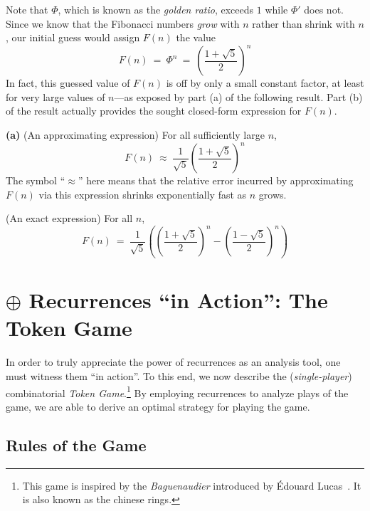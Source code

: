 \noindent
Note that $\Phi$, which is known as the \textit{golden ratio}, exceeds $1$ while $\Phi'$ does not.  Since we know that the Fibonacci numbers {\em grow} with $n$ rather than shrink with $n$, our initial guess would assign $F(n)$ the value
\[ F(n) \ = \ \Phi^n \ = \ {\displaystyle \left( \frac{1+\sqrt{5}}{2} \right)^n } \]
In fact, this guessed value of $F(n)$ is off by only a small constant factor, at least for very large values of $n$---as exposed by part (a) of the following result.  Part (b) of the result actually provides the sought closed-form expression for $F(n)$.

\begin{prop}
\label{thm:FibNo-GoldenRatio}
{\bf (a)} {\rm (An approximating expression)}
For all sufficiently large $n$,
\[ F(n) \ \approx \ \frac{1}{\sqrt{5}} \left(\frac{1+\sqrt{5}}{2} \right)^n \]
The symbol ``$\approx$'' here means that the relative error incurred by approximating $F(n)$ via this expression shrinks exponentially fast as $n$ grows.

\medskip

 {\rm (An exact expression)}
For all $n$,
\[ F(n) \ = \ 
\frac{1}{\sqrt{5}} \left( \left(\frac{1+\sqrt{5}}{2} \right)^n - \left(\frac{1-\sqrt{5}}{2} \right)^n \right)
\]
\end{prop}




\section{$\oplus$ Recurrences ``in Action'': The Token Game}
\label{sec:TokenGame}

In order to truly appreciate the power of recurrences as an analysis tool, one must witness them ``in action''.  
To this end, we now describe the ({\it single-player}) combinatorial {\it Token Game}.\footnote{This game is inspired by the \textit{Baguenaudier} introduced by \'{E}douard Lucas~\cite{Lucas}. It is also known as the chinese rings.}
By employing recurrences to analyze plays of the game, we are able to derive an optimal strategy for playing the game.

\subsection{Rules of the Game}
\label{sec:TokenGame-Rules}

